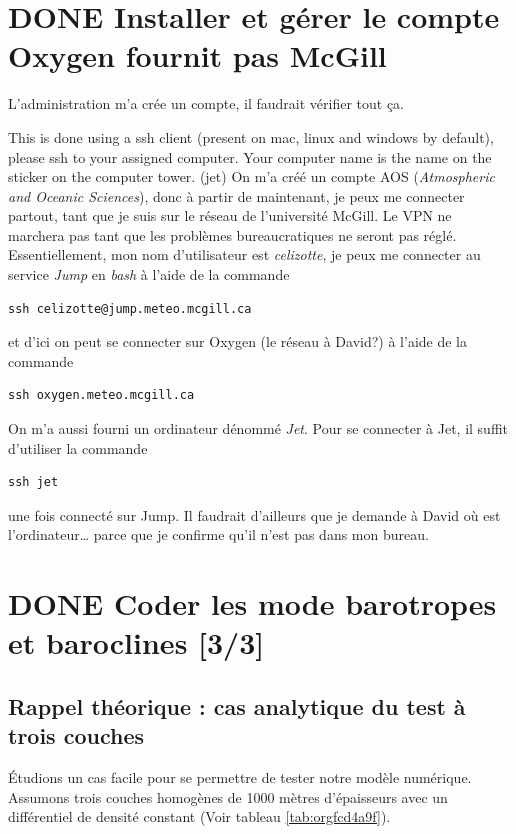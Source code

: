 \documentclass[10pt]{article}
\numberwithin{equation}{section}
\begin{document}
\section{{\bfseries\sffamily DONE} Installer et gérer le compte Oxygen fournit pas McGill}
\label{sec:org13c97e1}
L'administration m'a crée un compte, il faudrait vérifier tout ça.

This is done using a ssh client (present on mac, linux and windows by default), please ssh to your assigned computer. Your computer name is the name on the sticker on the computer tower. (jet)
On m'a créé un compte AOS (\emph{Atmospheric and Oceanic Sciences}), donc à partir de maintenant, je peux me connecter partout, tant que je suis sur le réseau de l'université McGill.
Le VPN ne marchera pas tant que les problèmes bureaucratiques ne seront pas réglé.\\[0pt]

Essentiellement, mon nom d'utilisateur est \emph{celizotte}, je peux me connecter au service \emph{Jump} en \emph{bash} à l'aide de la commande
\begin{verbatim}
ssh celizotte@jump.meteo.mcgill.ca
\end{verbatim}
et d'ici on peut se connecter sur Oxygen (le réseau à David?) à l'aide de la commande
\begin{verbatim}
ssh oxygen.meteo.mcgill.ca
\end{verbatim}

On m'a aussi fourni un ordinateur dénommé \emph{Jet}. Pour se connecter à Jet, il suffit d'utiliser la commande
\begin{verbatim}
ssh jet
\end{verbatim}
une fois connecté sur Jump. Il faudrait d'ailleurs que je demande à David où est l'ordinateur\ldots{} parce que je confirme qu'il n'est pas dans mon bureau.

\section{{\bfseries\sffamily DONE} Coder les mode barotropes et baroclines [3/3]}
\label{sec:org1f13b32}
\subsection{Rappel théorique : cas analytique du test à trois couches}
\label{sec:org5542d8d}
Étudions un cas facile pour se permettre de tester notre modèle numérique.
Assumons trois couches homogènes de 1000 mètres d'épaisseurs avec un différentiel de densité constant (Voir tableau \ref{tab:orgfcd4a9f}).
\end{document}
